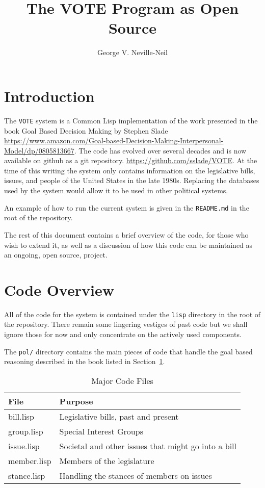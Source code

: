 \documentclass[10pt]{article}
\begin{document}

\title{The VOTE Program as Open Source}
\author{George V. Neville-Neil}
\maketitle
%
\section{Introduction}
\label{sec:intro}

The \verb|VOTE| system is a Common Lisp implementation of the work
presented in the book Goal Based Decision Making by Stephen Slade
\url{https://www.amazon.com/Goal-based-Decision-Making-Interpersonal-Model/dp/0805813667}.
The code has evolved over several decades and is now available on
github as a git repository. \url{https://github.com/sslade/VOTE}.  At
the time of this writing the system only contains information on the
legislative bills, issues, and people of the United States in the late
1980s.  Replacing the databases used by the system would allow it to
be used in other political systems.

An example of how to run the current system is given in the
\verb|README.md| in the root of the repository.

The rest of this document contains a brief overview of the code, for
those who wish to extend it, as well as a discussion of how this code
can be maintained as an ongoing, open source, project.

\section{Code Overview}
\label{sec:overview}

All of the code for the system is contained under the \verb|lisp|
directory in the root of the repository.  There remain some lingering
vestiges of past code but we shall ignore those for now and only
concentrate on the actively used components.

The \verb|pol/| directory contains the main pieces of code that handle
the goal based reasoning described in the book listed in
Section~\ref{sec:intro}.  
\begin{table*}
  \centering
  \begin{tabular}{|l|l|}
\hline
    File & Purpose \\
    \hline
    bill.lisp & Legislative bills, past and present\\ 
    group.lisp & Special Interest Groups \\
    issue.lisp & Societal and other issues that might go into a bill\\
    member.lisp & Members of the legislature \\
    stance.lisp  & Handling the stances of members on issues\\
\hline
  \end{tabular}
  \caption{Major Code Files}
  \label{tab:code}
\end{table*}
\end{document}
